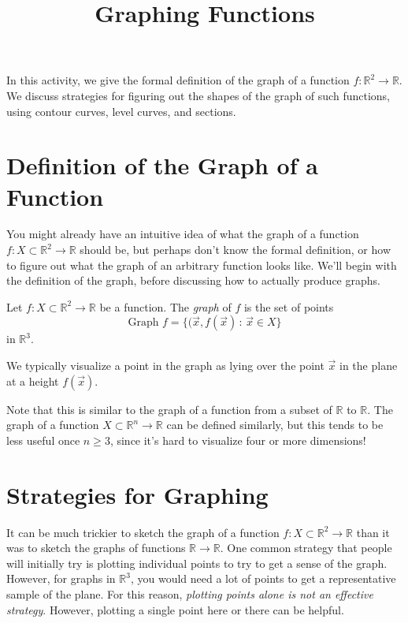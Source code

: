 \documentclass{ximera}
\title{Graphing Functions}
\begin{document}
\begin{abstract}
\end{abstract}
\maketitle

In this activity, we give the formal definition of the graph of a function $f:\mathbb{R}^2\rightarrow\mathbb{R}$. We discuss strategies for figuring out the shapes of the graph of such functions, using contour curves, level curves, and sections.

\section{Definition of the Graph of a Function}

You might already have an intuitive idea of what the graph of a function $f:X\subset\mathbb{R}^2\rightarrow\mathbb{R}$ should be, but perhaps don't know the formal definition, or how to figure out what the graph of an arbitrary function looks like. We'll begin with the definition of the graph, before discussing how to actually produce graphs.

\begin{definition}
Let $f:X\subset\mathbb{R}^2\rightarrow\mathbb{R}$ be a function. The \emph{graph} of $f$ is the set of points
\[
\textrm{Graph }f = \{(\vec{x},f(\vec{x})\,:\,\vec{x}\in X\}
\]
in $\mathbb{R}^3$.

We typically visualize a point in the graph as lying over the point $\vec{x}$ in the plane at a height $f(\vec{x})$.
\end{definition}

Note that this is similar to the graph of a function from a subset of $\mathbb{R}$ to $\mathbb{R}$. The graph of a function $X\subset\mathbb{R}^n\rightarrow\mathbb{R}$ can be defined similarly, but this tends to be less useful once $n\geq 3$, since it's hard to visualize four or more dimensions!

\section{Strategies for Graphing}

It can be much trickier to sketch the graph of a function $f:X\subset\mathbb{R}^2\rightarrow\mathbb{R}$ than it was to sketch the graphs of functions $\mathbb{R}\rightarrow\mathbb{R}$. One common strategy that people will initially try is plotting individual points to try to get a sense of the graph. However, for graphs in $\mathbb{R}^3$, you would need a lot of points to get a representative sample of the plane. For this reason, \emph{plotting points alone is not an effective strategy}. However, plotting a single point here or there can be helpful.
\end{document}

